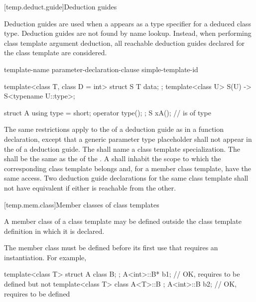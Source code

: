 [temp.deduct.guide]{Deduction guides}
%

\pnum
Deduction guides are used
when a  appears
as a type specifier
for a deduced class type.
Deduction guides are not found by name lookup.
Instead, when performing class template argument deduction,
all reachable deduction guides declared for the class template are considered.

\begin{bnf}
\br
     template-name \terminal{(} parameter-declaration-clause \terminal{)}  \terminal{->} simple-template-id \terminal{;}
\end{bnf}

\pnum
\begin{example}
\begin{codeblock}
template<class T, class D = int>
struct S {
  T data;
};
template<class U>
S(U) -> S<typename U::type>;

struct A {
  using type = short;
  operator type();
};
S x{A()};           //  is of type 
\end{codeblock}
\end{example}

\pnum
The same restrictions apply
to the 
of a deduction guide
as in a function declaration,
except that a generic parameter type placeholder
shall not appear in the  of
a deduction guide.
The 
shall name a class template specialization.
The 
shall be the same 
as the 
of the .
A 
shall inhabit the scope
to which the corresponding class template belongs
and, for a member class template, have the same access.
Two deduction guide declarations
for the same class template
shall not have equivalent 
if either is reachable from the other.

[temp.mem.class]{Member classes of class templates}

\pnum
A member class of a class template may be defined outside the class template
definition in which it is declared.
\begin{note}
The member class must be defined before its first use that requires
an instantiation.
For example,
\begin{codeblock}
template<class T> struct A {
  class B;
};
A<int>::B* b1;                          // OK, requires  to be defined but not 
template<class T> class A<T>::B { };
A<int>::B  b2;                          // OK, requires  to be defined
\end{codeblock}
\end{note}


